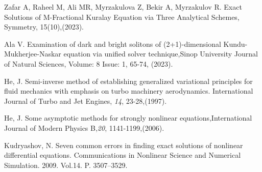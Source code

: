\documentclass[12pt]{llncs}
\begin{document}
\begin{thebibliography}{9} %
	 Zafar A, Raheel M, Ali MR, Myrzakulova Z, Bekir A, Myrzakulov R. Exact Solutions of M-Fractional Kuralay Equation via Three Analytical Schemes, Symmetry, 15(10),(2023). 
	
	

	
	
	
		 Ala V. 
 Examination of dark and bright solitons of (2+1)-dimensional Kundu-Mukherjee-Naskar equation via unified solver technique,Sinop University Journal of Natural Sciences, Volume: 8 Issue: 1, 65-74, 
 (2023).
	
	
	
He, J.   Semi-inverse method of establishing generalized variational principles for fluid mechanics with emphasis on turbo machinery aerodynamics. International Journal of Turbo and Jet Engines, \emph{14}, 23-28,(1997).


He, J.  Some asymptotic methods for strongly nonlinear equations,International Journal of Modern Physics B,\emph{20}, 1141-1199,(2006).


Kudryashov, N.  Seven common errors in finding exact solutions of nonlinear differential equations. Communications in Nonlinear Science and Numerical Simulation. 2009. Vol.{14}. P. 3507--3529.







\end{thebibliography}
\end{document}
